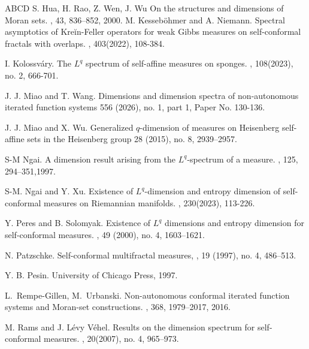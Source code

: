 \documentclass[12pt]{amsart}
\theoremstyle{plain}
\theoremstyle{definition}
\theoremstyle{remark}
\begin{document}
\begin{thebibliography}{ABCD}
 S. Hua, H. Rao, Z. Wen, J. Wu 
		\newblock On the structures and dimensions of Moran sets.
		, 43, 836--852, 2000.
M. Kesseböhmer and A. Niemann.
		\newblock  Spectral asymptotics of Kreĭn-Feller operators for weak Gibbs measures on self-conformal fractals with overlaps.
		, 403(2022), 108-384.


I. Kolossv\'{a}ry.
		\newblock  The $L^q$ spectrum of self-affine measures on sponges.
		,
 108(2023), no. 2, 666-701.
		

 J. J.  Miao and T.  Wang. 
\newblock Dimensions and dimension spectra of non-autonomous iterated function systems
  556 (2026), no. 1, part 1, Paper No. 130-136.

    J. J.  Miao and X.  Wu. 
\newblock Generalized  $q$-dimension of measures on Heisenberg self-affine sets in the Heisenberg group
  28 (2015), no. 8, 2939–2957.

	
S-M Ngai.
		\newblock A dimension result arising from the $L^q$-spectrum of a measure.
		, 125, 294–351,1997.

S-M. Ngai and Y. Xu.
		\newblock Existence of $L^q$-dimension and entropy dimension of self-conformal measures on Riemannian manifolds.
		, 230(2023), 113-226.

 Y. Peres and B. Solomyak.
		\newblock Existence of $L^q$ dimensions and entropy dimension for self-conformal measures.
		, 49 (2000), no. 4, 1603–1621.

 N. Patzschke.
		\newblock Self-conformal multifractal measures,
		, 19 (1997), no. 4, 486–513.

Y. B. Pesin.
		\newblock University of Chicago Press, 1997.


	 L.~Rempe-Gillen, M.~Urbanski.
		\newblock Non-autonomous conformal iterated function systems and Moran-set constructions.
		, 368, 1979--2017, 2016.
		
 M. Rams and J. L\'{e}vy V\'{e}hel.
		\newblock Results on the dimension spectrum for self-conformal measures.
		,	20(2007), no. 4, 965–973.





\end{thebibliography}
\end{document}
